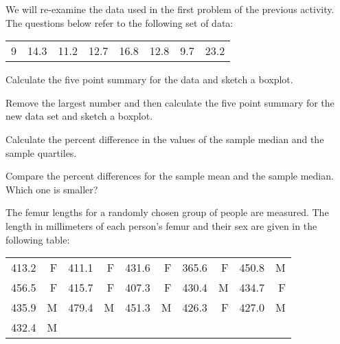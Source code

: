 
\begin{problem}

\item We will re-examine the data used in the first problem of the
  previous activity. The  questions below refer to the following set of data: \\
  \begin{tabular}{rrrrrrrr}
    9 & 14.3 & 11.2 & 12.7 & 16.8 & 12.8 & 9.7 & 23.2
  \end{tabular}

  \begin{subproblem}
  \item Calculate the five point summary for the data and sketch a boxplot.

    \vfill

  \item Remove the largest number and then calculate the five point
    summary for the new data set and sketch a boxplot.

    \vfill

  \item Calculate the percent difference in the values of the sample
    median and the sample quartiles.

    \vspace{4em}

  \item Compare the percent differences for the sample mean and the
    sample median. Which one is smaller?

    \vspace{4em}

  \end{subproblem}

  \clearpage

\item The femur lengths for a randomly chosen group of people are
  measured. The length in millimeters of each person's femur and their
  sex are given in the following table: \\
  \begin{tabular}{rr|rr|rr|rr|rr}
    413.2 & F & 411.1 & F & 431.6 & F & 365.6 & F & 450.8 & M \\
    456.5 & F & 415.7 & F & 407.3 & F & 430.4 & M & 434.7 & F \\
    435.9 & M & 479.4 & M & 451.3 & M & 426.3 & F & 427.0 & M \\
    432.4 & M
  \end{tabular}


\end{problem}
